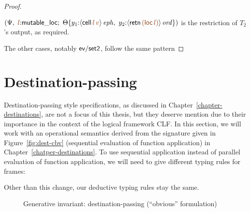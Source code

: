 \begin{proof}
\begin{description}
$\left(\Psi, ~ \lf{l}{:}{\sf mutable\_loc}; ~
   \tackon{\Theta}{y_1{:}\iseph{\susp{{\sf cell}\,\lf{l}\,\lf{v}}}, ~
                   y_2{:}\istrue{\susp{{\sf retn}\,\lf{({\sf loc}\,\lf{l})}}}}
   \right)$ is the restriction of $T_2$'s output, as
required.






\end{description}
The other cases, notably ${\sf ev/set2}$, follow the 
same pattern
\end{proof}

\section{Destination-passing}
\label{sec:gen-destinations}

Destination-passing style specifications, as discussed in
Chapter~\ref{chapter-destinations}, are not a focus of this thesis,
but they deserve mention due to their importance in the context of the
logical framework CLF. In this section, we will work with an
operational semantics derived from the signature given in
Figure~\ref{fig:dest-cbv} (sequential evaluation of function
application) in Chapter~\ref{chatper-destinations}. To use sequential
application instead of parallel evaluation of function application, we
will need to give different typing rules for frames:

\smallskip
{}
\smallskip

\noindent
Other than this change, our deductive typing rules stay the same.


\begin{figure}[tp]
\caption{Generative invariant: destination-passing (``obvious'' formulation)}
\label{fig:gen-destinations2} 
\end{figure}

